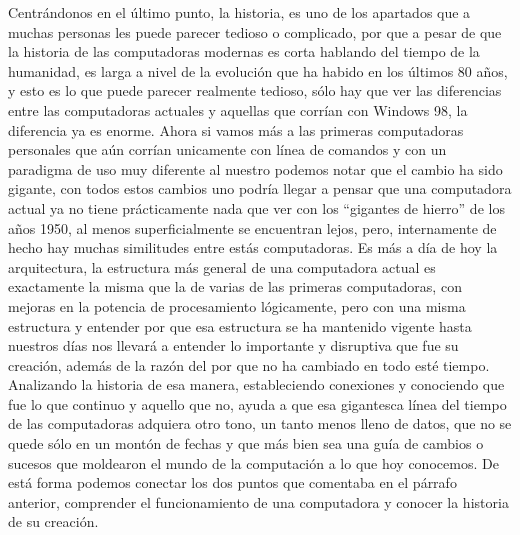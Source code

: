 \documentclass[letterpaper,12pt,oneside]{book}
\begin{document}
	
	Centrándonos en el último punto, la historia, es uno de los apartados que a muchas personas les puede parecer tedioso o complicado, 
	por que a pesar de que la historia de las computadoras modernas es corta hablando del tiempo
	de la humanidad, es larga a nivel de la evolución que ha habido en los últimos 80 años, y esto es lo que puede parecer realmente tedioso, sólo hay que ver las diferencias entre
	las computadoras actuales y aquellas que corrían con Windows 98, la diferencia ya es enorme. Ahora si vamos más  a las primeras computadoras personales
	que aún corrían unicamente con línea de comandos y con un paradigma de uso muy diferente al nuestro podemos notar que el cambio ha sido gigante, con todos estos
	cambios uno podría llegar a pensar que una computadora actual ya no tiene prácticamente nada que ver con los ``gigantes de hierro'' de los años 1950, 
	al menos superficialmente se encuentran lejos, pero, internamente de hecho hay muchas similitudes entre estás computadoras. Es más a día de hoy la arquitectura, la estructura
	más general de una computadora actual es exactamente la misma que la de varias de las primeras computadoras, con mejoras en la potencia de
	procesamiento lógicamente, pero con una misma estructura y entender por que esa estructura se ha mantenido vigente hasta nuestros días nos
	llevará a entender lo importante y disruptiva que fue su creación, además de la razón del por que no ha cambiado en todo esté tiempo. Analizando la historia de esa manera, estableciendo conexiones y conociendo que fue lo que continuo
	y aquello que no, ayuda a que esa gigantesca línea del tiempo de las computadoras adquiera otro tono, un tanto menos lleno de datos, que no se quede
	sólo en un montón de fechas y que más bien sea una guía de cambios o sucesos que moldearon el mundo de la computación a lo que hoy conocemos. De está forma podemos conectar los dos puntos que comentaba en el párrafo anterior,
	comprender el funcionamiento de una computadora y conocer la historia de su creación.
	
\end{document}

